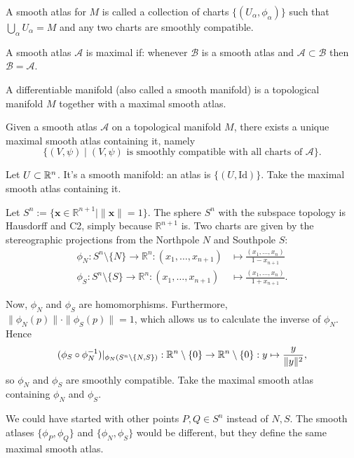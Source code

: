 \begin{definition}
    A smooth atlas for $M$ is called a collection of charts $\{(U_\alpha, \phi_\alpha)\}$ such that $\bigcup_{\alpha} U_\alpha = M$ and any two charts are smoothly compatible.
\end{definition}
\begin{definition}
    A smooth atlas $\mathcal A$ is maximal if: whenever $\mathcal B$ is a smooth atlas and $\mathcal A \subset \mathcal B$ then $\mathcal B = \mathcal A$.
\end{definition}
\begin{definition}
    A differentiable manifold (also called a smooth manifold) is a topological manifold $M$ together with a maximal smooth atlas.
\end{definition}
\begin{remark}
    Given a smooth atlas $\mathcal A$ on a topological manifold  $M$, there exists a unique maximal smooth atlas containing it, namely
    \[
        \{(V, \psi)  \mid  (V, \psi) \text{ is smoothly compatible with all charts of $\mathcal A$}\} 
    .\] 
\end{remark}

\begin{eg}
    Let $U \subset \mathbb{R}^n$. It's a smooth manifold: an atlas is $\{(U, \text{Id})\}$. Take the maximal smooth atlas containing it.
\end{eg}
\begin{eg}
    Let $S^{n} := \{\mathbf{x} \in \mathbb R^{n+1}  \mid \|\mathbf{x}\| = 1\}$.
    The sphere $S^{n}$ with the subspace topology is Hausdorff and C2, simply because $\mathbb R^{n+1} $ is.
    Two charts are given by the stereographic projections from the Northpole $N$ and Southpole $S$:
    \begin{align*}
        \phi_N: S^{n} \setminus \{N\} \to \mathbb R^{n}: (x_1, \ldots, x_{n +1}) &\mapsto \frac{(x_1, \ldots, x_n)}{1 - x_{n+1}}\\
        \phi_S: S^{n} \setminus \{S\} \to \mathbb R^{n}: (x_1, \ldots, x_{n+1}) &\mapsto \frac{(x_1, \ldots, x_n)}{1 + x_{n+1}}
    .\end{align*}

    Now, $\phi_N$ and  $\phi_S$ are homomorphisms.
    Furthermore, $\|\phi_N(p)\|\cdot \|\phi_S(p)\| = 1$, which allows us to calculate the inverse of $\phi_{N}$.
    Hence
    \[
        (\phi_S \circ \phi_N ^{-1})|_{\phi_N(S^n\setminus\{N,S\})}: \mathbb{R}^n \setminus \{0\} \to  \mathbb{R}^n \setminus \{0\}: y \mapsto \frac{y}{\|y\|^2}
    ,\] 
    so $\phi_N$ and  $\phi_S$ are smoothly compatible.
    Take the maximal smooth atlas containing  $\phi_N$ and  $\phi_S$.
\end{eg}
\begin{remark}
    We could have started with other points $P,Q\in S^n$ instead of $N, S$. The smooth atlases $\{\phi_P,\phi_Q\}$ and $\{\phi_N,\phi_S\}$ would be different, but they define    the same maximal smooth atlas.
\end{remark}

